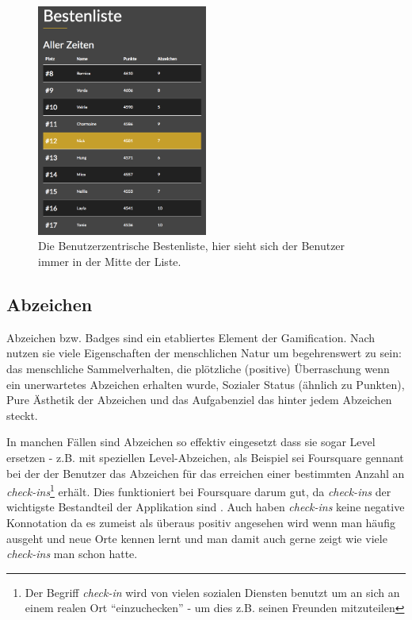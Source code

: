 \documentclass[12pt,twoside]{book}
\begin{document}
\begin{figure}[H]
    \centering
    \includegraphics[width=0.5\textwidth]{images/infoboard_leaderboard_user.png}
    \caption{Die Benutzerzentrische Bestenliste, hier sieht sich der Benutzer immer in der Mitte der Liste.}
    \label{fig:leaderboarduser}
\end{figure}

\subsection{Abzeichen}

Abzeichen bzw. Badges sind ein etabliertes Element der Gamification. Nach \citep{zichermann2011gamification, 55} nutzen sie viele Eigenschaften der menschlichen Natur um begehrenswert zu sein: das menschliche Sammelverhalten, die plötzliche (positive) Überraschung wenn ein unerwartetes Abzeichen erhalten wurde, Sozialer Status (ähnlich zu Punkten), Pure Ästhetik der Abzeichen und das Aufgabenziel das hinter jedem Abzeichen steckt.

In manchen Fällen sind Abzeichen so effektiv eingesetzt dass sie sogar Level ersetzen - z.B. mit speziellen Level-Abzeichen, als Beispiel sei Foursquare gennant bei der der Benutzer das Abzeichen für das erreichen einer bestimmten Anzahl an \textit{check-ins}\footnote{Der Begriff \textit{check-in} wird von vielen sozialen Diensten benutzt um an sich an einem realen Ort ``einzuchecken'' - um dies z.B. seinen Freunden mitzuteilen} erhält. Dies funktioniert bei Foursquare darum gut, da \textit{check-ins} der wichtigste Bestandteil der Applikation sind \citep{zichermann2011gamification, 57}. Auch haben \textit{check-ins} keine negative Konnotation da es zumeist als überaus positiv angesehen wird wenn man häufig ausgeht und neue Orte kennen lernt und man damit auch gerne zeigt wie viele \textit{check-ins} man schon hatte.
\end{document}
